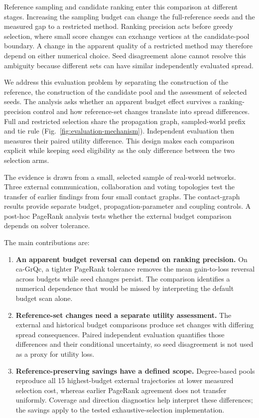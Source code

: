 \documentclass[smallextended]{svjour3}
\begin{document}
Reference sampling and candidate ranking enter this comparison at different stages. Increasing the sampling budget can change the full-reference seeds and the measured gap to a restricted method. Ranking precision acts before greedy selection, where small score changes can exchange vertices at the candidate-pool boundary. A change in the apparent quality of a restricted method may therefore depend on either numerical choice. Seed disagreement alone cannot resolve this ambiguity because different sets can have similar independently evaluated spread.

We address this evaluation problem by separating the construction of the reference, the construction of the candidate pool and the assessment of selected seeds. The analysis asks whether an apparent budget effect survives a ranking-precision control and how reference-set changes translate into spread differences. Full and restricted selection share the propagation graph, sampled-world prefix and tie rule (Fig.~\ref{fig:evaluation-mechanism}). Independent evaluation then measures their paired utility difference. This design makes each comparison explicit while keeping seed eligibility as the only difference between the two selection arms.

The evidence is drawn from a small, selected sample of real-world networks. Three external communication, collaboration and voting topologies test the transfer of earlier findings from four small contact graphs. The contact-graph results provide separate budget, propagation-parameter and coupling controls. A post-hoc PageRank analysis tests whether the external budget comparison depends on solver tolerance.

The main contributions are:
\begin{enumerate}
\item[(1)] \textbf{An apparent budget reversal can depend on ranking precision.} On ca-GrQc, a tighter PageRank tolerance removes the mean gain-to-loss reversal across budgets while seed changes persist. The comparison identifies a numerical dependence that would be missed by interpreting the default budget scan alone.
\item[(2)] \textbf{Reference-set changes need a separate utility assessment.} The external and historical budget comparisons produce set changes with differing spread consequences. Paired independent evaluation quantifies those differences and their conditional uncertainty, so seed disagreement is not used as a proxy for utility loss.
\item[(3)] \textbf{Reference-preserving savings have a defined scope.} Degree-based pools reproduce all 15 highest-budget external trajectories at lower measured selection cost, whereas earlier PageRank agreement does not transfer uniformly. Coverage and direction diagnostics help interpret these differences; the savings apply to the tested exhaustive-selection implementation.
\end{enumerate}
\end{document}
